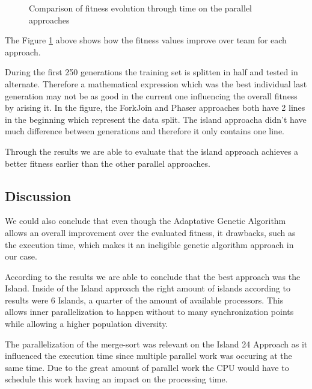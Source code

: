 \documentclass[runningheads]{llncs}
\begin{document}

\begin{figure}[H]
\centering
{}
\caption{Comparison of fitness evolution through time on the parallel approaches} \label{comparacaoLinhas}
\end{figure}

The Figure \ref{comparacaoLinhas} above shows how the fitness values improve over team for each approach.

During the first 250 generations the training set is splitten in half and tested in alternate. Therefore a mathematical expression which was the best individual last generation may not be as good in the current one influencing the overall fitness by arising it. In the figure, the ForkJoin and Phaser approaches both have 2 lines in the beginning which represent the data split. The island approacha didn't have much difference between generations and therefore it only contains one line.

Through the results we are able to evaluate that the island approach achieves a better fitness earlier than the other parallel approaches.

\subsection{Discussion}

We could also conclude that even though the Adaptative Genetic Algorithm allows an overall improvement over the evaluated fitness, it drawbacks, such as the execution time, which makes it an ineligible genetic algorithm approach in our case.

According to the results we are able to conclude that the best approach was the Island. Inside of the Island approach the right amount of islands according to results were 6 Islands, a quarter of the amount of available processors. This allows inner parallelization to happen without to many synchronization points while allowing a higher population diversity.

The parallelization of the merge-sort was relevant on the Island 24 Approach as it influenced the execution time since multiple parallel work was occuring at the same time. Due to the great amount of parallel work the CPU would have to schedule this work having an impact on the processing time.
\end{document}
